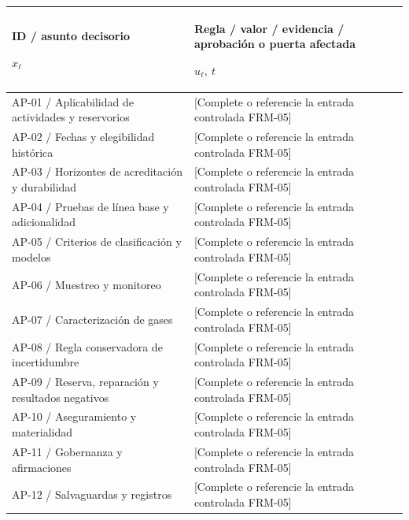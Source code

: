 {\sffamily\fontsize{8.3}{10.3}\selectfont\begin{longtable}{@{}P{72.45mm} P{96.04mm}@{}}
\toprule
\textbf{ID / asunto decisorio}\par {\normalfont\fontsize{8.2}{10}\selectfont $x_{\ell}$} & \textbf{Regla / valor / evidencia / aprobación o puerta afectada}\par {\normalfont\fontsize{8.2}{10}\selectfont $u_{\ell},\ t$}\\\midrule\endhead
\rule{0pt}{7.7mm}AP-01 / Aplicabilidad de actividades y reservorios & [Complete o referencie la entrada controlada FRM-05]\\\hline
\rule{0pt}{7.7mm}AP-02 / Fechas y elegibilidad histórica & [Complete o referencie la entrada controlada FRM-05]\\\hline
\rule{0pt}{7.7mm}AP-03 / Horizontes de acreditación y durabilidad & [Complete o referencie la entrada controlada FRM-05]\\\hline
\rule{0pt}{7.7mm}AP-04 / Pruebas de línea base y adicionalidad & [Complete o referencie la entrada controlada FRM-05]\\\hline
\rule{0pt}{7.7mm}AP-05 / Criterios de clasificación y modelos & [Complete o referencie la entrada controlada FRM-05]\\\hline
\rule{0pt}{7.7mm}AP-06 / Muestreo y monitoreo & [Complete o referencie la entrada controlada FRM-05]\\\hline
\rule{0pt}{7.7mm}AP-07 / Caracterización de gases & [Complete o referencie la entrada controlada FRM-05]\\\hline
\rule{0pt}{7.7mm}AP-08 / Regla conservadora de incertidumbre & [Complete o referencie la entrada controlada FRM-05]\\\hline
\rule{0pt}{7.7mm}AP-09 / Reserva, reparación y resultados negativos & [Complete o referencie la entrada controlada FRM-05]\\\hline
\rule{0pt}{7.7mm}AP-10 / Aseguramiento y materialidad & [Complete o referencie la entrada controlada FRM-05]\\\hline
\rule{0pt}{7.7mm}AP-11 / Gobernanza y afirmaciones & [Complete o referencie la entrada controlada FRM-05]\\\hline
\rule{0pt}{7.7mm}AP-12 / Salvaguardas y registros & [Complete o referencie la entrada controlada FRM-05]\\\hline
\end{longtable}}

